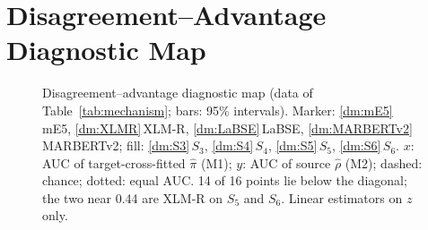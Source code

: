 \section{Disagreement--Advantage Diagnostic Map}
\label{app:diagmap}
\begin{figure}[H]
\begin{minipage}[c]{0.47\textwidth}

\end{minipage}\hfill
\begin{minipage}[c]{0.5\textwidth}
\caption{Disagreement--advantage diagnostic map (data of Table~\ref{tab:mechanism}; bars: 95\% intervals). Marker: \ref{dm:mE5}\,mE5, \ref{dm:XLMR}\,XLM-R, \ref{dm:LaBSE}\,LaBSE, \ref{dm:MARBERTv2}\,MARBERTv2; fill: \ref{dm:S3}\,$S_3$, \ref{dm:S4}\,$S_4$, \ref{dm:S5}\,$S_5$, \ref{dm:S6}\,$S_6$. $x$: AUC of target-cross-fitted $\hat\pi$ (M1); $y$: AUC of source $\hat\rho$ (M2); dashed: chance; dotted: equal AUC. 14 of 16 points lie below the diagonal; the two near 0.44 are XLM-R on $S_5$ and $S_6$. Linear estimators on $z$ only.}
\label{fig:diagmap}
\end{minipage}
\end{figure}
